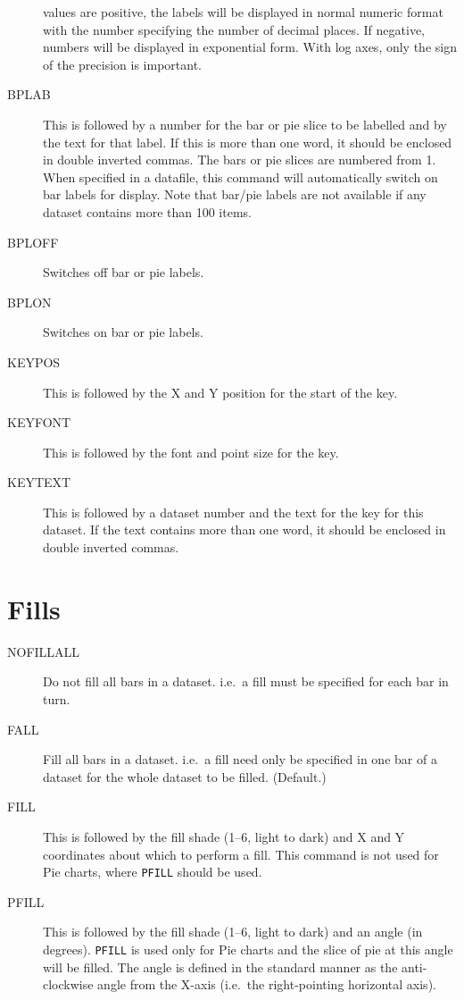\begin{description}
values are positive, the labels will be displayed in normal numeric format with the 
number specifying the number of decimal places. If negative, numbers will be 
displayed in exponential  form. With log axes, only the sign of the precision is 
important.
\item[BPLAB] This is followed by a number for the bar or pie slice to be labelled
and by the text for that label. If this is more than one word, it should be enclosed 
in double inverted commas. The bars or pie slices are numbered from 1. When 
specified in a datafile, this command will 
automatically switch on bar labels for display. Note that bar/pie labels are not 
available if any dataset contains more than 100 items.
\item[BPLOFF\dag] Switches off bar or pie labels.
\item[BPLON\dag] Switches on bar or pie labels.
\item[KEYPOS] This is followed by the X and Y position for the start of the key.
\item[KEYFONT] This is followed by the font and point size for the key.
\item[KEYTEXT] This is followed by a dataset number and the text for the key for 
this dataset. If the text contains more than one word, it should be enclosed 
in double inverted commas.
\end{description}

\section{Fills}
\begin{description}
\item[NOFILLALL] Do not fill all bars in a dataset. i.e.\ a fill must be 
specified for each bar in turn.
\item[FALL\dag] Fill all bars in a dataset. i.e.\ a fill need only be specified in one 
bar of a dataset for the whole dataset to be filled. (Default.)
\item[FILL] This is followed by the fill shade (1--6, light to dark)
and X and Y coordinates 
about which to perform a fill. This command is not used for Pie charts, where
{\tt PFILL} should be used.
\item[PFILL] This is followed by the fill shade (1--6, light to dark)
and an angle (in degrees).
{\tt PFILL} is used only for Pie charts and the slice of pie at this angle will be 
filled. The angle is defined in the standard manner as the anti-clockwise angle
from the X-axis (i.e.\ the right-pointing  horizontal axis).
\end{description}


